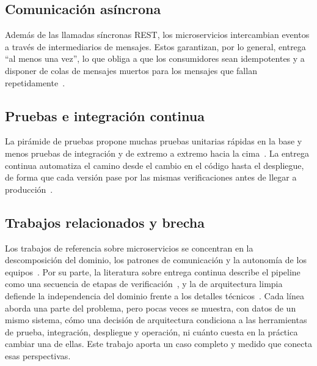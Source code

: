 \documentclass[conference]{IEEEtran}
\begin{document}
\subsection{Comunicación asíncrona}
Además de las llamadas síncronas REST, los microservicios intercambian eventos a través de intermediarios de mensajes. Estos garantizan, por lo general, entrega ``al menos una vez'', lo que obliga a que los consumidores sean idempotentes y a disponer de colas de mensajes muertos para los mensajes que fallan repetidamente~\cite{kleppmann2017,sqs}.

\subsection{Pruebas e integración continua}
La pirámide de pruebas propone muchas pruebas unitarias rápidas en la base y menos pruebas de integración y de extremo a extremo hacia la cima~\cite{cohn2009}. La entrega continua automatiza el camino desde el cambio en el código hasta el despliegue, de forma que cada versión pase por las mismas verificaciones antes de llegar a producción~\cite{humble2010}.

\subsection{Trabajos relacionados y brecha}
Los trabajos de referencia sobre microservicios se concentran en la descomposición del dominio, los patrones de comunicación y la autonomía de los equipos~\cite{dragoni2017,newman2021,richardson2018}. Por su parte, la literatura sobre entrega continua describe el pipeline como una secuencia de etapas de verificación~\cite{humble2010}, y la de arquitectura limpia defiende la independencia del dominio frente a los detalles técnicos~\cite{martin2017,cockburn2005}. Cada línea aborda una parte del problema, pero pocas veces se muestra, con datos de un mismo sistema, cómo una decisión de arquitectura condiciona a las herramientas de prueba, integración, despliegue y operación, ni cuánto cuesta en la práctica cambiar una de ellas. Este trabajo aporta un caso completo y medido que conecta esas perspectivas.
\end{document}
